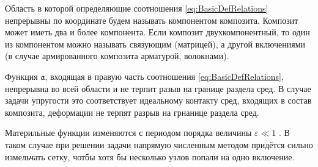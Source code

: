 Область в которой определяющие соотношения 
\ref{eq:BasicDefRelations}
непрерывны по координате будем называть компонентом композита.
Композит может иметь два и более компонента. 
Если композит двухкомпонентный, то один из компонентом можно называть связующим (матрицей), а другой включениями (в случае армированного композита арматурой, волокнами).

Функция
$\mathfrak{a}$,
входящая в правую часть соотношения
\ref{eq:BasicDefRelations},
непрерывна во всей области и не терпит разыв на границе раздела сред. 
В случае задачи упругости это соответствует идеальному контакту сред, входящих в состав композита, деформации не терпят разрыв на грнанице раздела сред.

Материльные функции изменяются с периодом порядка величины
$ \varepsilon \ll 1 $
. В таком случае при решении задачи напрямую численным методом придётся сильно измельчать сетку,
чотбы хотя бы несколько узлов попали на одно включение. 
